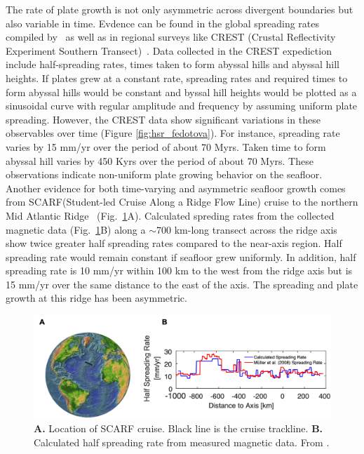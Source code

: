 \documentclass[letterpaper,12pt,notitle]{memphisthesis}                     %
\begin{document}
The rate of plate growth is not only asymmetric across divergent boundaries but also variable in time. Evdence can be found in the global spreading rates compiled by~\citet{Muller2008} as well as in regional surveys like CREST (Crustal Reflectivity Experiment Southern Transect)~\citep{Fedotova2017}. Data collected in the CREST expediction include half-spreading rates, times taken to form abyssal hills and abyssal hill heights. If plates grew at a constant rate, spreading rates and required times to form abyssal hills would be constant and byssal hill heights would be plotted as a sinusoidal curve with regular amplitude and frequency by assuming uniform plate spreading. However, the CREST data show significant variations in these observables over time (Figure \ref{fig:hsr_fedotova}). For instance, spreading rate varies by 15 mm/yr over the period of about 70 Myrs. Taken time to form abyssal hill varies by 450 Kyrs over the period of about 70 Myrs. These observations indicate non-uniform plate growing behavior on the seafloor.
%
Another evidence for both time-varying and asymmetric seafloor growth comes from SCARF(Student-led Cruise Along a Ridge Flow Line) cruise to the northern Mid Atlantic Ridge~\citep{Shinevar2018} (Fig.~\ref{fig:scarf}A). Calculated spreding rates from the collected magnetic data (Fig.~\ref{fig:scarf}B) along a $\sim$700 km-long transect across the ridge axis show twice greater half spreading rates compared to the near-axis region. Half spreading rate would remain constant if seafloor grew uniformly. In addition, half spreading rate is 10 mm/yr within 100 km to the west from the ridge axis but is 15 mm/yr over the same distance to the east of the axis. The spreading and plate growth at this ridge has been asymmetric. 
%
\begin{figure}[!htb]
	\centering
	\includegraphics[width=0.85\linewidth,trim=4 4 2 12,clip]{./figs/scarf.png}
	\caption{\textbf{A.} Location of SCARF cruise. Black line is the cruise trackline. \textbf{B.} Calculated half spreading rate from measured magnetic data. From \citet{Shinevar2018}.}
	\label{fig:scarf}
\end{figure}
\end{document}
